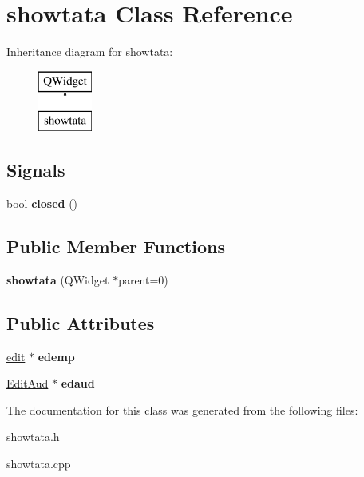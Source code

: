 \hypertarget{classshowtata}{}\section{showtata Class Reference}
\label{classshowtata}
Inheritance diagram for showtata\+:\begin{figure}[H]
\begin{center}
\leavevmode
\includegraphics[height=2.000000cm]{classshowtata}
\end{center}
\end{figure}
\subsection*{Signals}
\begin{DoxyCompactItemize}
\item 
\hypertarget{classshowtata_af7c54c814de835f906e841b9ecaa6643}{}\label{classshowtata_af7c54c814de835f906e841b9ecaa6643} 
bool {\bfseries closed} ()
\end{DoxyCompactItemize}
\subsection*{Public Member Functions}
\begin{DoxyCompactItemize}
\item 
\hypertarget{classshowtata_a8b9382b64c639b083122cf4a5cee975d}{}\label{classshowtata_a8b9382b64c639b083122cf4a5cee975d} 
{\bfseries showtata} (Q\+Widget $\ast$parent=0)
\end{DoxyCompactItemize}
\subsection*{Public Attributes}
\begin{DoxyCompactItemize}
\item 
\hypertarget{classshowtata_a221cbd798a46ba1c75062e358bc17ad2}{}\label{classshowtata_a221cbd798a46ba1c75062e358bc17ad2} 
\hyperlink{classedit}{edit} $\ast$ {\bfseries edemp}
\item 
\hypertarget{classshowtata_ace79d422d191a7cf665c216495250a62}{}\label{classshowtata_ace79d422d191a7cf665c216495250a62} 
\hyperlink{class_edit_aud}{Edit\+Aud} $\ast$ {\bfseries edaud}
\end{DoxyCompactItemize}


The documentation for this class was generated from the following files\+:\begin{DoxyCompactItemize}
\item 
showtata.\+h\item 
showtata.\+cpp\end{DoxyCompactItemize}
